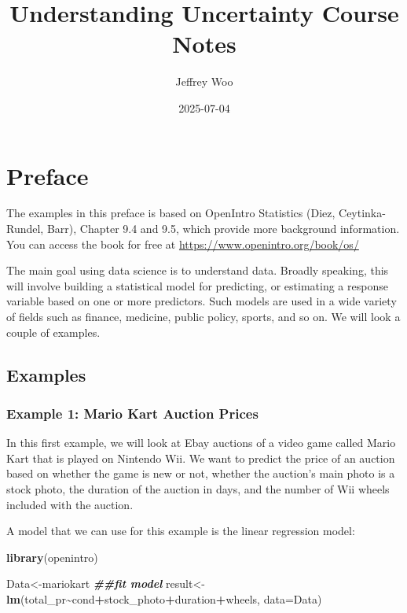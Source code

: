 \documentclass[
]{book}
\title{Understanding Uncertainty Course Notes}
\author{Jeffrey Woo}
\date{2025-07-04}
\newenvironment{Shaded}{\begin{snugshade}}{\end{snugshade}}
\newcommand{\AttributeTok}[1]{\textcolor[rgb]{0.13,0.29,0.53}{#1}}
\newcommand{\DocumentationTok}[1]{\textcolor[rgb]{0.56,0.35,0.01}{\textbf{\textit{#1}}}}
\newcommand{\FunctionTok}[1]{\textcolor[rgb]{0.13,0.29,0.53}{\textbf{#1}}}
\newcommand{\NormalTok}[1]{#1}
\newcommand{\OtherTok}[1]{\textcolor[rgb]{0.56,0.35,0.01}{#1}}
\newcommand{\SpecialCharTok}[1]{\textcolor[rgb]{0.81,0.36,0.00}{\textbf{#1}}}
\begin{document}
\maketitle

{
\setcounter{tocdepth}{1}
\tableofcontents
}
\chapter*{Preface}\label{preface}

The examples in this preface is based on OpenIntro Statistics (Diez, Ceytinka-Rundel, Barr), Chapter 9.4 and 9.5, which provide more background information. You can access the book for free at \url{https://www.openintro.org/book/os/}

The main goal using data science is to understand data. Broadly speaking, this will involve building a statistical model for predicting, or estimating a response variable based on one or more predictors. Such models are used in a wide variety of fields such as finance, medicine, public policy, sports, and so on. We will look a couple of examples.

\section{Examples}\label{examples}

\subsection{Example 1: Mario Kart Auction Prices}\label{example-1-mario-kart-auction-prices}

In this first example, we will look at Ebay auctions of a video game called Mario Kart that is played on Nintendo Wii. We want to predict the price of an auction based on whether the game is new or not, whether the auction's main photo is a stock photo, the duration of the auction in days, and the number of Wii wheels included with the auction.

A model that we can use for this example is the linear regression model:

\begin{Shaded}
\begin{Highlighting}[]
\FunctionTok{library}\NormalTok{(openintro)}

\NormalTok{Data}\OtherTok{\textless{}{-}}\NormalTok{mariokart}
\DocumentationTok{\#\#fit model}
\NormalTok{result}\OtherTok{\textless{}{-}}\FunctionTok{lm}\NormalTok{(total\_pr}\SpecialCharTok{\textasciitilde{}}\NormalTok{cond}\SpecialCharTok{+}\NormalTok{stock\_photo}\SpecialCharTok{+}\NormalTok{duration}\SpecialCharTok{+}\NormalTok{wheels, }\AttributeTok{data=}\NormalTok{Data)}
\end{Highlighting}
\end{Shaded}
\end{document}
